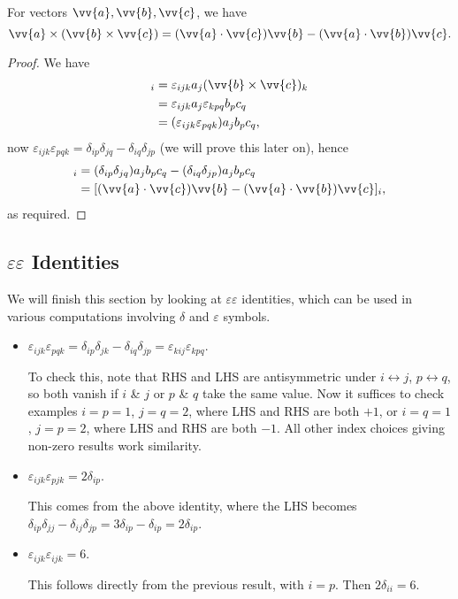 \begin{proposition}
    For vectors $\vv{a}, \vv{b}, \vv{c}$, we have
    $$
    \vv{a} \times(\vv{b} \times \vv{c})=(\vv{a} \cdot \vv{c}) \vv{b}-(\vv{a} \cdot \vv{b}) \vv{c}.
    $$
\end{proposition}
\begin{proof}
We have
\begin{align*}
    [\vv{a} \times (\vv{b} \times \vv{c})]_i &= \varepsilon_{ijk} a_j (\vv{b} \times \vv{c})_k \\
        &= \varepsilon_{ijk} a_j \varepsilon_{kpq} b_p c_q \\
 &= (\varepsilon_{ijk}\varepsilon_{pqk}) a_j b_p c_q,
\end{align*}    
now $\varepsilon_{ijk}\varepsilon_{pqk} = \delta_{ip} \delta_{jq} - \delta_{iq} \delta_{jp}$ (we will prove this later on), hence
\begin{align*}
    [\vv{a} \times (\vv{b} \times \vv{c})]_i &= (\delta_{ip} \delta_{jq})a_j b_p c_q - (\delta_{iq} \delta_{jp}) a_j b_p c_q \\
    &= [(\vv{a} \cdot \vv{c})\vv{b} - (\vv{a} \cdot \vv{b})\vv{c}]_i,
\end{align*}
as required.
\end{proof}

\subsection{$\varepsilon \varepsilon$ Identities}

We will finish this section by looking at $\varepsilon \varepsilon$ identities, which can be used in various computations involving $\delta$ and $\varepsilon$ symbols.

\begin{itemize}
    \item $\varepsilon_{ijk}\varepsilon_{pqk} = \delta_{ip} \delta_{jk} - \delta_{iq} \delta_{jp} = \varepsilon_{kij} \varepsilon_{kpq}$.
    
    To check this, note that RHS and LHS are antisymmetric under $i \leftrightarrow j$, $p \leftrightarrow q$, so both vanish if $i$ \& $j$ or $p$ \& $q$ take the same value. Now it suffices to check examples $i = p = 1$, $j = q = 2$, where LHS and RHS are both $+1$, or $i = q = 1$, $j = p = 2$, where LHS and RHS are both $-1$. All other index choices giving non-zero results work similarity.

    \item $\varepsilon_{ijk} \varepsilon_{pjk} = 2 \delta_{ip}$.
    
    This comes from the above identity, where the LHS becomes $\delta_{ip} \delta_{jj} - \delta_{ij} \delta_{jp} = 3\delta_{ip} - \delta_{ip} = 2\delta_{ip}$.

    \item $\varepsilon_{ijk} \varepsilon_{ijk} = 6$.

    This follows directly from the previous result, with $i = p$. Then $2 \delta_{ii} = 6$.
\end{itemize}



